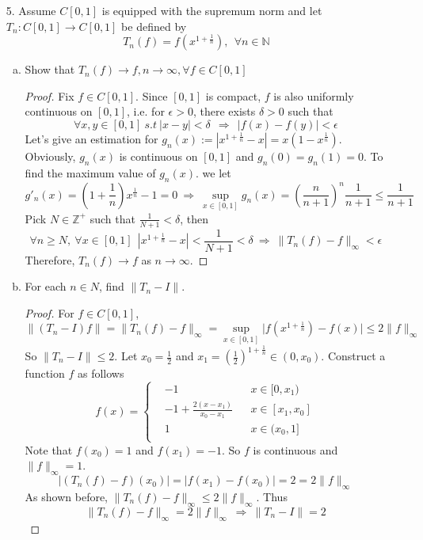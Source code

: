 \begin{itemize}
	\item[5.] Assume $C[0, 1]$ is equipped with the supremum norm and let $T_n : C[0, 1] \rightarrow C[0, 1]$ be defined by
	$$
	T_n(f) = f\left( x^{1+\frac{1}{n}}\right), ~~\forall n\in \mathbb{N}
	$$
	\begin{enumerate}[(a)]
		\item Show that $T_n(f) \rightarrow f, n \rightarrow \infty, \forall f\in C[0,1]$
		\begin{proof}
			Fix $f\in C[0,1]$. Since $[0,1]$ is compact, $f$ is also uniformly continuous on $[0,1]$, i.e.
			for $\epsilon > 0$, there exists $\delta > 0$ such that 
			$$
			\forall x, y\in [0,1] ~s.t~ |x-y| < \delta ~~\Rightarrow~~  |f(x) - f(y) | < \epsilon
			$$
			Let's give an estimation for $g_n(x) := \left\lvert x^{1+\frac{1}{n}} - x \right\rvert = x\left(1 - x^{\frac{1}{n}}\right)$. Obviously, $g_n(x)$ is continuous on $[0,1]$ and $g_n(0) = g_n(1) = 0$. To find the maximum value of $g_n(x)$. we let
			$$
			g'_n(x) = \left(1+\frac{1}{n}\right)x^{\frac{1}{n}} - 1 =0 ~\Rightarrow~ \sup_{x\in [0,1]} g_n(x) = \left( \frac{n}{n+1} \right)^n \frac{1}{n+1} \le \frac{1}{n+1}
			$$
			Pick $N\in \mathbb{Z}^+$ such that $\frac{1}{N+1} < \delta$, then
			$$
			\forall n\ge N, ~\forall x\in [0,1]~~ \left\lvert x^{1+\frac{1}{n}} - x \right\rvert <\frac{1}{N+1}< \delta ~\Rightarrow~ \lVert T_n(f)-f\rVert_\infty < \epsilon 
			$$
			Therefore, $T_n(f)\rightarrow f$ as $n\rightarrow \infty$.
		\end{proof}
		\item For each $n \in N$, find $\lVert T_n - I\rVert$.
		\begin{proof}
			For $f\in C[0,1]$, 
			$$
			\lVert (T_n-I)f\rVert=\lVert T_n(f) - f\rVert_\infty = \sup_{x\in [0,1]} \lvert f(x^{1+\frac{1}{n}}) - f(x)\rvert \le 2 \lVert f\rVert_\infty
			$$
			So $\lVert T_n -I\rVert \le 2$. 
			Let $x_0 = \frac{1}{2}$ and $x_1=  \left(\frac{1}{2}\right)^{1+\frac{1}{n}} \in (0, x_0)$. Construct a function $f$ as follows 
			$$
			f(x)= \left\{
			\begin{aligned}
			&-1& &x\in [0, x_1)\\
			&-1+\frac{2(x-x_1)}{x_0-x_1}& &x\in [x_1, x_0]\\
			&1& &x\in (x_0, 1]\\
			\end{aligned}
			\right.
			$$
			Note that $f(x_0) = 1$ and $f(x_1) = -1$. So $f$ is continuous and $\lVert f\rVert_\infty = 1$. 
			$$
			\lvert (T_n(f)-f)(x_0)\rvert = \lvert f(x_1) - f(x_0)\rvert = 2 = 2\lVert f\rVert_\infty
			$$
			As shown before, $\lVert T_n(f) - f\rVert_\infty \le 2\lVert f\rVert_\infty$. Thus $$\lVert T_n(f) - f\rVert_\infty = 2\lVert f\rVert_\infty ~\Rightarrow~ \lVert T_n-I\rVert = 2$$
		\end{proof}
	\end{enumerate}


\end{itemize}
